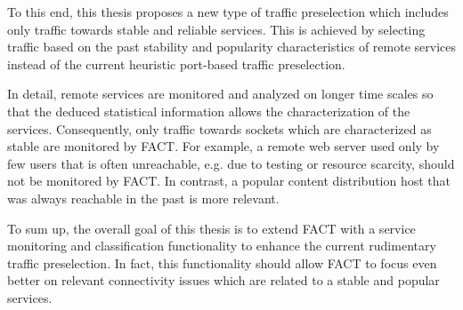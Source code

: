 To this end, this thesis proposes a new type of traffic preselection which 
includes only traffic towards stable and reliable services. This is achieved by 
selecting traffic based on the past stability and popularity characteristics of 
remote services instead of the current heuristic port-based traffic 
preselection.

In detail, remote services are monitored and analyzed on longer time scales so
that the deduced statistical information allows the characterization of the 
services. Consequently, only traffic towards sockets which are characterized as 
stable are monitored by \gls{FACT}. For example, a remote web server used only 
by few users that is often unreachable, e.g. due to testing or resource 
scarcity, should not be monitored by \gls{FACT}. In contrast, a popular content 
distribution host that was always reachable in the past is more relevant. 

To sum up, the overall goal of this thesis is to extend \gls{FACT} with a 
service monitoring and classification functionality to enhance the current 
rudimentary traffic preselection. In fact, this functionality should allow 
\gls{FACT} to focus even better on relevant connectivity issues which are 
related to a stable and popular services.


